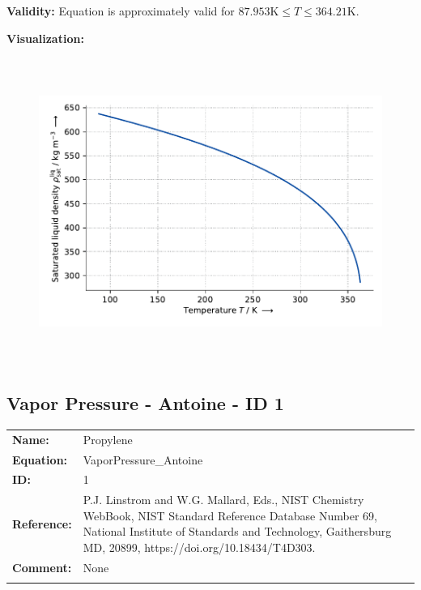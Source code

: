 \textbf{Validity:}
\newline
Equation is approximately valid for $87.953 \si{\kelvin} \leq T \leq 364.21 \si{\kelvin}$.
\newline

\textbf{Visualization:}
%
\begin{figure}[!htp]
{\noindent\includegraphics[height=10cm, keepaspectratio]{figs/ref/ref_Propylene_SaturatedLiquidDensity_EoS1_1.pdf}}
\end{figure}
%

\FloatBarrier
\newpage
\subsection{Vapor Pressure - Antoine - ID 1}
%
\begin{tabular}[l]{|lp{11.5cm}|}
\hline
\addlinespace

\textbf{Name:} & Propylene \\
\textbf{Equation:} & VaporPressure\_Antoine \\
\textbf{ID:} & 1 \\
\textbf{Reference:} & P.J. Linstrom and W.G. Mallard, Eds., NIST Chemistry WebBook, NIST Standard Reference Database Number 69, National Institute of Standards and Technology, Gaithersburg MD, 20899, https://doi.org/10.18434/T4D303. \\
\textbf{Comment:} & None \\

\addlinespace
\hline
\end{tabular}
\newline

